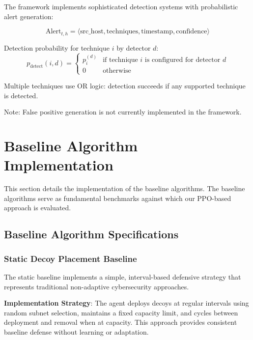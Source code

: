 \documentclass[12pt,oneside]{article}
\begin{document}
The framework implements sophisticated detection systems with probabilistic alert generation:

\begin{equation}
\text{Alert}_{t,h} = \langle \text{src\_host}, \text{techniques}, \text{timestamp}, \text{confidence} \rangle
\end{equation}

Detection probability for technique $i$ by detector $d$:
\begin{equation}
p_{\text{detect}}(i, d) = \begin{cases}
p_i^{(d)} & \text{if technique } i \text{ is configured for detector } d \\
0 & \text{otherwise}
\end{cases}
\end{equation}

Multiple techniques use OR logic: detection succeeds if any supported technique is detected.

Note: False positive generation is not currently implemented in the framework.


\clearpage

\section{Baseline Algorithm Implementation}

This section details the implementation of the baseline algorithms. The baseline algorithms serve as fundamental benchmarks against which our PPO-based approach is evaluated.

\subsection{Baseline Algorithm Specifications}

\subsubsection{Static Decoy Placement Baseline}

The static baseline implements a simple, interval-based defensive strategy that represents traditional non-adaptive cybersecurity approaches.

\textbf{Implementation Strategy}: The agent deploys decoys at regular intervals using random subnet selection, maintains a fixed capacity limit, and cycles between deployment and removal when at capacity. This approach provides consistent baseline defense without learning or adaptation.
\end{document}
